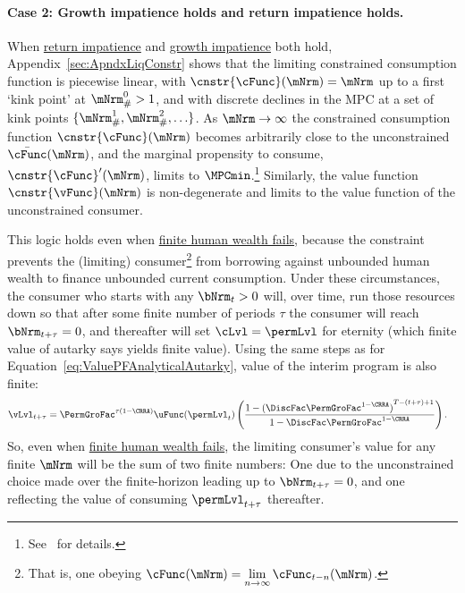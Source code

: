\documentclass[\econtexRoot/BufferStockTheory]{subfiles}
\begin{document}
\paragraph{Case 2: Growth impatience holds and return impatience holds.}
When  \hyperlink{RIC}{return impatience} and  \hyperlink{GICRaw}{growth impatience} both hold, Appendix~\ref{sec:ApndxLiqConstr} shows that the limiting constrained consumption function is piecewise linear, with $\cnstr{\cFunc}(\mNrm)=\mNrm$ up to a first `kink point' at $\mNrm_{\#}^{0}>1$, and with discrete declines in the MPC at a set of kink points $\{\mNrm_{\#}^{1},\mNrm_{\#}^{2},\ldots\}$.
As $\mNrm \rightarrow \infty$ the constrained consumption function $\cnstr{\cFunc}(\mNrm)$ becomes arbitrarily close to the unconstrained $\bar{\cFunc}(\mNrm)$, and the marginal propensity to consume, $\cnstr{\cFunc}^{\prime}(\mNrm)$, limits to $\MPCmin$.\footnote{See~\cite{chkLiqConstr} for details.}
Similarly, the value function $\cnstr{\vFunc}(\mNrm)$ is non-degenerate and limits to the value function of the unconstrained consumer.


This logic holds even when \hyperlink{FHWC}{finite human wealth fails}, because the constraint prevents the (limiting) consumer\footnote{That is, one obeying $\cFunc(\mNrm) = \lim\limits_{n \rightarrow \infty} \cFunc_{t-n}(\mNrm)$.} from borrowing against unbounded human wealth to finance unbounded current consumption.
Under these circumstances, the consumer who starts with any $\bNrm_{t} > 0$ will, over time, run those resources down so that after some finite number of periods $\tau$ the consumer will reach $\bNrm_{t+\tau} = 0$, and thereafter will set $\cLvl = \permLvl$ for eternity (which \hypertarget{PFFVAC}{finite value of autarky} says yields finite value).
Using the same steps as for Equation~\eqref{eq:ValuePFAnalyticalAutarky}, value of the interim program is also finite: \hypertarget{PFFVAC}{}
\begin{equation}\begin{gathered}\begin{aligned}
  \vLvl_{t+\tau} 
  & = \PermGroFac^{\tau(1-\CRRA)} \uFunc(\permLvl_{t})\left(\frac{1-{(\DiscFac \PermGroFac^{1-\CRRA})}^{T-(t+\tau)+1}}{1-\DiscFac \PermGroFac^{1-\CRRA}}\right).
\end{aligned}\end{gathered}\end{equation}
So, even when \hyperlink{FHWC}{finite human wealth fails}, the limiting consumer's value for any finite $\mNrm$ will be the sum of two finite numbers: One due to the unconstrained choice made over the finite-horizon leading up to $\bNrm_{t+\tau} = 0$, and one reflecting the value of consuming $\permLvl_{t+\tau}$ thereafter.
\end{document}
